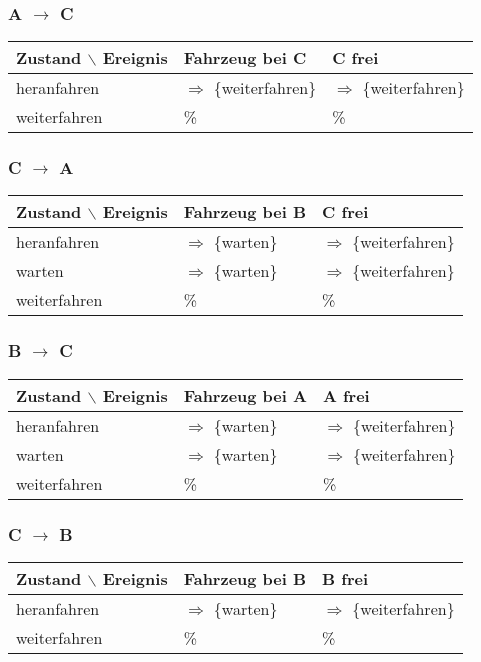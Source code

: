\documentclass[koma,a4paper,10pt]{org-article}
\begin{document}
\subsubsection{A $\to$ C}
\label{sec-4-2-2}
\begin{center}
\begin{tabular}{lll}
Zustand $\backslash$ Ereignis & Fahrzeug bei C & C frei\\
\hline
heranfahren & $\Rightarrow$ \{weiterfahren\} & $\Rightarrow$ \{weiterfahren\}\\
weiterfahren & \% & \%\\
\end{tabular}
\end{center}

\subsubsection{C $\to$ A}
\label{sec-4-2-3}
\begin{center}
\begin{tabular}{lll}
Zustand $\backslash$ Ereignis & Fahrzeug bei B & C frei\\
\hline
heranfahren & $\Rightarrow$ \{warten\} & $\Rightarrow$ \{weiterfahren\}\\
warten & $\Rightarrow$ \{warten\} & $\Rightarrow$ \{weiterfahren\}\\
weiterfahren & \% & \%\\
\end{tabular}
\end{center}

\subsubsection{B $\to$ C}
\label{sec-4-2-4}
\begin{center}
\begin{tabular}{lll}
Zustand $\backslash$ Ereignis & Fahrzeug bei A & A frei\\
\hline
heranfahren & $\Rightarrow$ \{warten\} & $\Rightarrow$ \{weiterfahren\}\\
warten & $\Rightarrow$ \{warten\} & $\Rightarrow$ \{weiterfahren\}\\
weiterfahren & \% & \%\\
\end{tabular}
\end{center}

\subsubsection{C $\to$ B}
\label{sec-4-2-5}
\begin{center}
\begin{tabular}{lll}
Zustand $\backslash$ Ereignis & Fahrzeug bei B & B frei\\
\hline
heranfahren & $\Rightarrow$ \{warten\} & $\Rightarrow$ \{weiterfahren\}\\
weiterfahren & \% & \%\\
\end{tabular}
\end{center}
\end{document}
